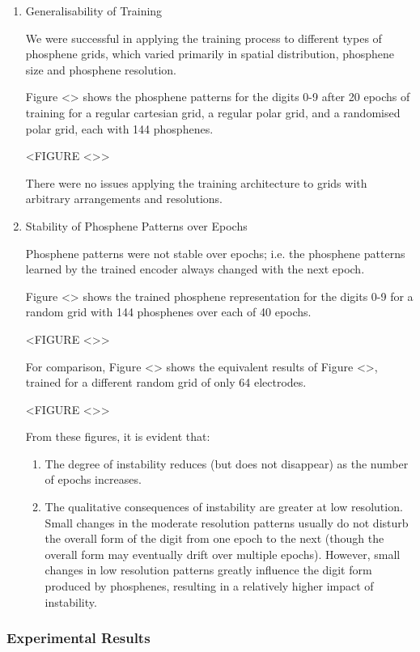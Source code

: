 \documentclass[11pt]{article}
\begin{document}
\begin{enumerate}
\item Generalisability of Training
\label{sec:orgca20e25}

We were successful in applying the training process to different types of phosphene grids, which varied primarily in spatial distribution, phosphene size and phosphene resolution.

Figure <> shows the phosphene patterns for the digits 0-9 after 20 epochs of training for a regular cartesian grid, a regular polar grid, and a randomised polar grid, each with 144 phosphenes.

<FIGURE <>>

There were no issues applying the training architecture to grids with arbitrary arrangements and resolutions.

\item Stability of Phosphene Patterns over Epochs
\label{sec:orgfaf8140}

Phosphene patterns were not stable over epochs; i.e. the phosphene patterns learned by the trained encoder always changed with the next epoch.

Figure <> shows the trained phosphene representation for the digits 0-9 for a random grid with 144 phosphenes over each of 40 epochs.

<FIGURE <>>

For comparison, Figure <> shows the equivalent results of Figure <>, trained for a different random grid of only 64 electrodes.

<FIGURE <>>

From these figures, it is evident that:

\begin{enumerate}
\item The degree of instability reduces (but does not disappear) as the number of epochs increases.
\item The qualitative consequences of instability are greater at low resolution.
Small changes in the moderate resolution patterns usually do not disturb the overall form of the digit from one epoch to the next (though the overall form may eventually drift over multiple epochs).
However, small changes in low resolution patterns greatly influence the digit form produced by phosphenes, resulting in a relatively higher impact of instability.
\end{enumerate}
\end{enumerate}

\subsubsection{Experimental Results}
\label{sec:org8efb8ed}
\end{document}
